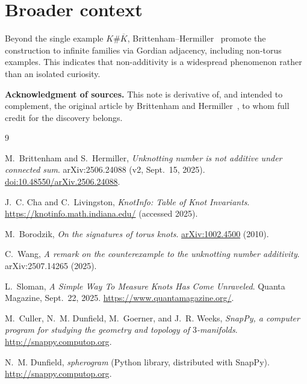 \documentclass[11pt]{article}
\theoremstyle{plain}
\theoremstyle{remark}
\begin{document}
\section{Broader context}
Beyond the single example \(K\#\overline K\), Brittenham--Hermiller~\cite{BH25} promote the construction to infinite families via Gordian adjacency, including non-torus examples.
This indicates that non-additivity is a widespread phenomenon rather than an isolated curiosity.

\bigskip
\noindent\textbf{Acknowledgment of sources.}
This note is derivative of, and intended to complement, the original article by Brittenham and Hermiller~\cite{BH25}, to whom full credit for the discovery belongs.

\begin{thebibliography}{9}

M.~Brittenham and S.~Hermiller,
\newblock \emph{Unknotting number is not additive under connected sum}.
\newblock arXiv:2506.24088 (v2, Sept.\ 15, 2025).
\newblock \href{https://doi.org/10.48550/arXiv.2506.24088}{doi:10.48550/arXiv.2506.24088}.

J.~C. Cha and C.~Livingston,
\newblock \emph{KnotInfo: Table of Knot Invariants}.
\newblock \url{https://knotinfo.math.indiana.edu/} (accessed 2025).

M.~Borodzik,
\newblock \emph{On the signatures of torus knots}.
\newblock \href{https://arxiv.org/abs/1002.4500}{arXiv:1002.4500} (2010).

C.~Wang,
\newblock \emph{A remark on the counterexample to the unknotting number additivity}.
\newblock arXiv:2507.14265 (2025).

L.~Sloman,
\newblock \emph{A Simple Way To Measure Knots Has Come Unraveled}.
\newblock Quanta Magazine, Sept.\ 22, 2025.
\newblock \url{https://www.quantamagazine.org/}.

M.~Culler, N.~M. Dunfield, M.~Goerner, and J.~R. Weeks,
\newblock \emph{SnapPy, a computer program for studying the geometry and topology of $3$-manifolds}.
\newblock \url{http://snappy.computop.org}.

N.~M. Dunfield,
\newblock \emph{spherogram} (Python library, distributed with SnapPy).
\newblock \url{http://snappy.computop.org}.

\end{thebibliography}
\end{document}
